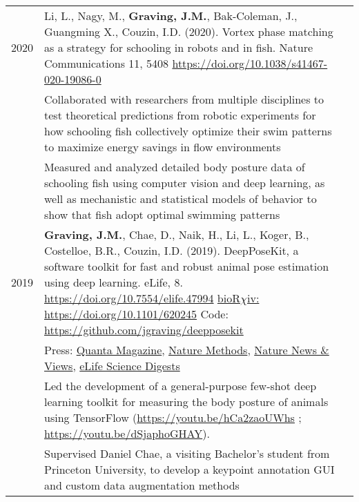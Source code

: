 \documentclass[letterpaper,10pt,oneside]{article}
\newcommand{\tabitem}{\hspace{2mm}\textbullet\hspace{2mm}}
\begin{document}
\begin{small}
\begin{longtable}{@{} l p{5in}l}
\large{2020}
& Li, L., Nagy, M., \textbf{Graving, J.M.}, Bak-Coleman, J., Guangming X., Couzin, I.D. (2020). Vortex phase matching as a strategy for schooling in robots and in fish. Nature Communications 11, 5408 \href{https://doi.org/10.1038/s41467-020-19086-0 }{https://doi.org/10.1038/s41467-020-19086-0} \vspace{2mm} \\
& 	\tabitem Collaborated with researchers from multiple disciplines to test theoretical predictions from robotic experiments for how schooling fish collectively optimize their swim patterns to maximize energy savings in flow environments \vspace{1mm} \\
& 	\tabitem Measured and analyzed detailed body posture data of schooling fish using computer vision and deep learning, as well as mechanistic and statistical models of behavior to show that fish adopt optimal swimming patterns\vspace{5mm}\\

\large{2019}
 &\textbf{Graving, J.M.}, Chae, D., Naik, H., Li, L., Koger, B., Costelloe, B.R., Couzin, I.D. (2019). DeepPoseKit, a software toolkit for fast and robust animal pose estimation using deep learning. eLife, 8. \href{https://doi.org/10.7554/elife.47994}{https://doi.org/10.7554/elife.47994}  \href{https://doi.org/10.1101/620245}{bioR$\chi$iv: https://doi.org/10.1101/620245} Code: \href{https://github.com/jgraving/deepposekit}{ https://github.com/jgraving/deepposekit} \\
 &Press: \href{https://www.quantamagazine.org/to-decode-the-brain-scientists-automate-the-study-of-behavior-20191210/}{Quanta Magazine}, 
 \href{https://doi.org/10.1038/s41592-019-0678-2}{Nature Methods},
 \href{https://doi.org/10.1038/d41586-019-02942-5}{Nature News \& Views},
 \href{https://elifesciences.org/digests/47994/machine-learning-animal-poses-to-understand-behavior}{eLife Science Digests}
 \vspace{2mm} \\
 & 	\tabitem Led the development of a general-purpose few-shot deep learning toolkit for measuring the body posture of animals using TensorFlow (\href{https://youtu.be/hCa2zaoUWhs}{https://youtu.be/hCa2zaoUWhs} \hspace{1mm}; \href{https://youtu.be/dSjaphoGHAY}{https://youtu.be/dSjaphoGHAY}). \vspace{1mm}  \\
  & 	\tabitem Supervised Daniel Chae, a visiting Bachelor's student from Princeton University, to develop a keypoint annotation GUI and custom data augmentation methods \vspace{5mm}\\


\end{longtable}
\end{small}
\end{document}
